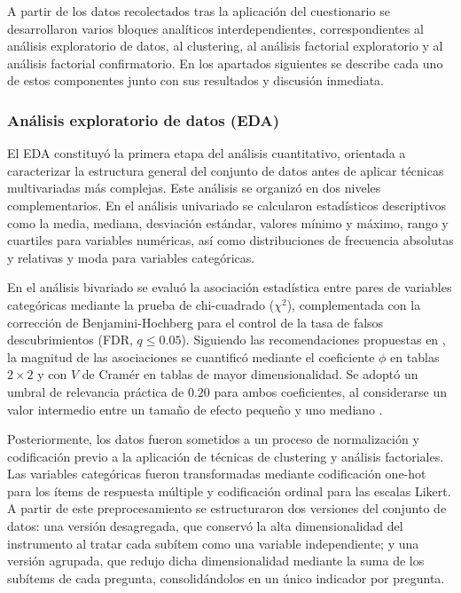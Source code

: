 \documentclass[conference]{IEEEtran}
\begin{document}
A partir de los datos recolectados tras la aplicación del cuestionario se desarrollaron varios bloques analíticos interdependientes, correspondientes al análisis exploratorio de datos, al clustering, al análisis factorial exploratorio y al análisis factorial confirmatorio. En los apartados siguientes se describe cada uno de estos componentes junto con sus resultados y discusión inmediata.

\subsubsection{Análisis exploratorio de datos (EDA)}

El EDA constituyó la primera etapa del análisis cuantitativo, orientada a caracterizar la estructura general del conjunto de datos antes de aplicar técnicas multivariadas más complejas. Este análisis se organizó en dos niveles complementarios. En el análisis univariado se calcularon estadísticos descriptivos como la media, mediana, desviación estándar, valores mínimo y máximo, rango y cuartiles para variables numéricas, así como distribuciones de frecuencia absolutas y relativas y moda para variables categóricas.

En el análisis bivariado se evaluó la asociación estadística entre pares de variables categóricas mediante la prueba de chi-cuadrado ($\chi^2$), complementada con la corrección de Benjamini-Hochberg \cite{FDR} para el control de la tasa de falsos descubrimientos (FDR, $q \leq 0.05$). Siguiendo las recomendaciones propuestas en \cite{cohen1988statistical}, la magnitud de las asociaciones se cuantificó mediante el coeficiente $\phi$ en tablas $2 \times 2$ y con $V$ de Cramér en tablas de mayor dimensionalidad. Se adoptó un umbral de relevancia práctica de $0.20$ para ambos coeficientes, al considerarse un valor intermedio entre un tamaño de efecto pequeño y uno mediano \cite{cohen1988statistical}.

Posteriormente, los datos fueron sometidos a un proceso de normalización y codificación previo a la aplicación de técnicas de clustering y análisis factoriales. Las variables categóricas fueron transformadas mediante codificación one-hot \cite{wold_model_1957} para los ítems de respuesta múltiple y codificación ordinal para las escalas Likert. A partir de este preprocesamiento se estructuraron dos versiones del conjunto de datos: una versión desagregada, que conservó la alta dimensionalidad del instrumento al tratar cada subítem como una variable independiente; y una versión agrupada, que redujo dicha dimensionalidad mediante la suma de los subítems de cada pregunta, consolidándolos en un único indicador por pregunta.
\end{document}
